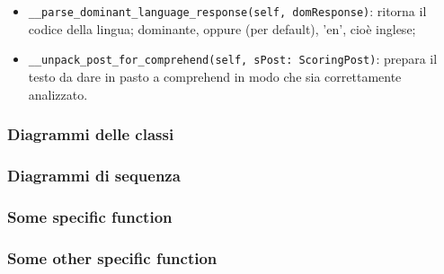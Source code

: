 \begin{itemize}
    \item \verb+__parse_dominant_language_response(self, domResponse)+: ritorna il codice della lingua;
    dominante, oppure (per default), 'en', cioè inglese;
    \item \verb+__unpack_post_for_comprehend(self, sPost: ScoringPost)+: prepara il testo da dare in
    pasto a comprehend in modo che sia correttamente analizzato.

\end{itemize}

\subsubsection{Diagrammi delle classi}
\subsubsection{Diagrammi di sequenza}
\subsubsection{Some specific function}
\subsubsection{Some other specific function}
